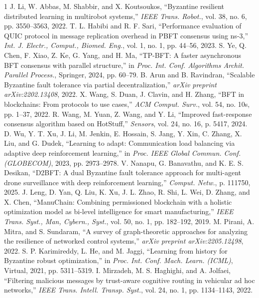 \documentclass[manuscript,screen,review]{acmart}
\begin{document}
\begin{thebibliography}{1}
J. Li, W. Abbas, M. Shabbir, and X. Koutsoukos, ``Byzantine resilient distributed learning in multirobot systems,'' \textit{IEEE Trans. Robot.}, vol. 38, no. 6, pp. 3550--3563, 2022.
T. L. Habibi and R. F. Sari, ``Performance evaluation of QUIC protocol in message replication overhead in PBFT consensus using ns-3,'' \textit{Int. J. Electr., Comput., Biomed. Eng.}, vol. 1, no. 1, pp. 44--56, 2023.
S. Ye, Q. Chen, F. Xiao, Z. Ke, G. Yang, and H. Ma, ``TP-BFT: A faster asynchronous BFT consensus with parallel structure,'' in \textit{Proc. Int. Conf. Algorithms Archit. Parallel Process.}, Springer, 2024, pp. 60--79.
B. Arun and B. Ravindran, ``Scalable Byzantine fault tolerance via partial decentralization,'' \textit{arXiv preprint arXiv:2202.13408}, 2022.
X. Wang, S. Duan, J. Clavin, and H. Zhang, ``BFT in blockchains: From protocols to use cases,'' \textit{ACM Comput. Surv.}, vol. 54, no. 10s, pp. 1--37, 2022.
R. Wang, M. Yuan, Z. Wang, and Y. Li, ``Improved fast-response consensus algorithm based on HotStuff,'' \textit{Sensors}, vol. 24, no. 16, p. 5417, 2024.
D. Wu, Y. T. Xu, J. Li, M. Jenkin, E. Hossain, S. Jang, Y. Xin, C. Zhang, X. Liu, and G. Dudek, ``Learning to adapt: Communication load balancing via adaptive deep reinforcement learning,'' in \textit{Proc. IEEE Global Commun. Conf. (GLOBECOM)}, 2023, pp. 2973--2978.
V. Nanapu, G. Banavathu, and K. E. S. Desikan, ``D2BFT: A dual Byzantine fault tolerance approach for multi-agent drone surveillance with deep reinforcement learning,'' \textit{Comput. Netw.}, p. 111750, 2025.
J. Leng, D. Yan, Q. Liu, K. Xu, J. L. Zhao, R. Shi, L. Wei, D. Zhang, and X. Chen, ``ManuChain: Combining permissioned blockchain with a holistic optimization model as bi-level intelligence for smart manufacturing,'' \textit{IEEE Trans. Syst., Man, Cybern., Syst.}, vol. 50, no. 1, pp. 182--192, 2019.
M. Pirani, A. Mitra, and S. Sundaram, ``A survey of graph-theoretic approaches for analyzing the resilience of networked control systems,'' \textit{arXiv preprint arXiv:2205.12498}, 2022.
S. P. Karimireddy, L. He, and M. Jaggi, ``Learning from history for Byzantine robust optimization,'' in \textit{Proc. Int. Conf. Mach. Learn. (ICML)}, Virtual, 2021, pp. 5311--5319.
I. Mirzadeh, M. S. Haghighi, and A. Jolfaei, ``Filtering malicious messages by trust-aware cognitive routing in vehicular ad hoc networks,'' \textit{IEEE Trans. Intell. Transp. Syst.}, vol. 24, no. 1, pp. 1134--1143, 2022.

\end{thebibliography}
\end{document}
